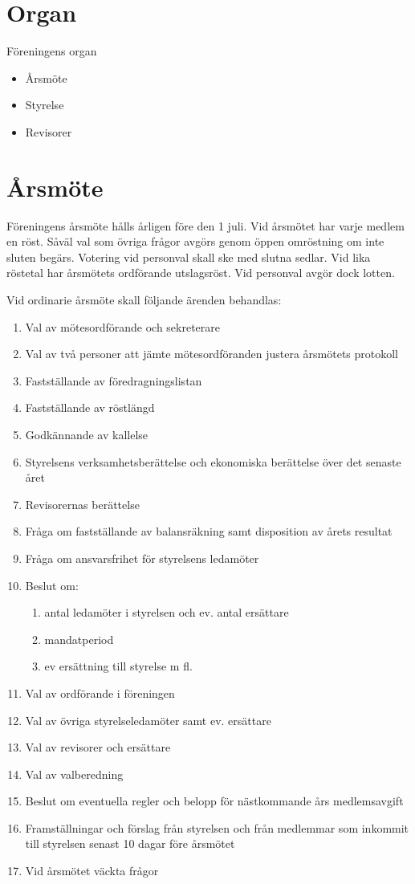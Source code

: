 \documentclass[11pt, a4paper]{article}
\begin{document}
\section{Organ}
Föreningens organ

\begin{itemize}
    \item Årsmöte
    \item Styrelse
    \item Revisorer
\end{itemize}

\section{Årsmöte}
Föreningens årsmöte hålls årligen före den 1 juli. Vid årsmötet har varje medlem en röst. Såväl val som övriga frågor avgörs genom öppen omröstning om inte sluten begärs. Votering vid personval skall ske med slutna sedlar. Vid lika röstetal har årsmötets ordförande utslagsröst. Vid personval avgör dock lotten.

Vid ordinarie årsmöte skall följande ärenden behandlas:

\begin{enumerate}
    \item Val av mötesordförande och sekreterare
    \item Val av två personer att jämte mötesordföranden justera årsmötets protokoll
    \item Fastställande av föredragningslistan
    \item Fastställande av röstlängd
    \item Godkännande av kallelse
    \item Styrelsens verksamhetsberättelse och ekonomiska berättelse över det senaste året
    \item Revisorernas berättelse
    \item Fråga om fastställande av balansräkning samt disposition av årets resultat
    \item Fråga om ansvarsfrihet för styrelsens ledamöter
    \item Beslut om:
    \begin{enumerate}
        \item antal ledamöter i styrelsen och ev. antal ersättare
        \item mandatperiod
        \item ev ersättning till styrelse m fl.
    \end{enumerate}
    \item Val av ordförande i föreningen
    \item Val av övriga styrelseledamöter samt ev. ersättare
    \item Val av revisorer och ersättare
    \item Val av valberedning
    \item Beslut om eventuella regler och belopp för nästkommande års medlemsavgift
    \item Framställningar och förslag från styrelsen och från medlemmar som inkommit till styrelsen senast 10 dagar före årsmötet
    \item Vid årsmötet väckta frågor
\end{enumerate}
\end{document}
